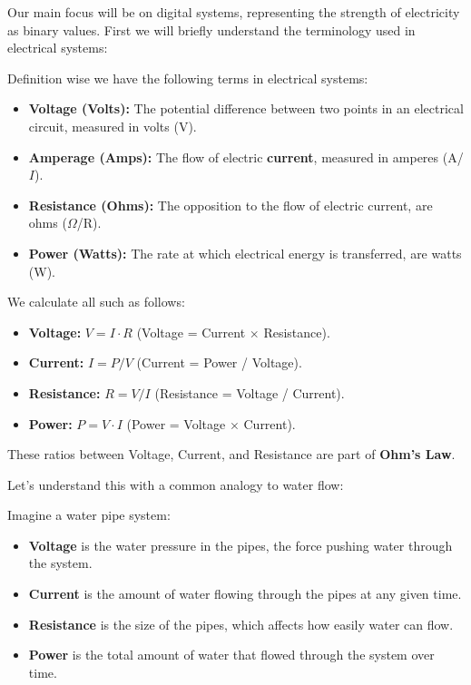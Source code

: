 \noindent
Our main focus will be on digital systems, representing the strength of electricity as binary values.
First we will briefly understand the terminology used in electrical systems:
\begin{Def}

    \label{def:voltage_amps_watts}

    Definition wise we have the following terms in electrical systems:
    \begin{itemize}
        \item \textbf{Voltage (Volts):} The potential difference between two points in an electrical circuit, measured in volts (V).
        \item \textbf{Amperage (Amps):} The flow of electric \textbf{current}, measured in amperes (A/$I$).
        \item \textbf{Resistance (Ohms):} The opposition to the flow of electric current, are ohms ($\Omega$/R).
        \item \textbf{Power (Watts):} The rate at which electrical energy is transferred, are watts (W).
    \end{itemize}

    \noindent
    We calculate all such as follows:
    \begin{itemize}
        \item \textbf{Voltage:} $V = I \cdot R$ (Voltage = Current $\times$ Resistance).
        \item \textbf{Current:} $I = P / V$ (Current = Power / Voltage).
        \item \textbf{Resistance:} $R = V / I$ (Resistance = Voltage / Current).
        \item \textbf{Power:} $P = V \cdot I$ (Power = Voltage $\times$ Current).
    \end{itemize}

    \noindent
    These ratios between Voltage, Current, and Resistance are part of \textbf{Ohm's Law}.
\end{Def}

\newpage 

\noindent
Let's understand this with a common analogy to water flow:

\begin{Example}

    \noindent
    Imagine a water pipe system:
    \begin{itemize}
        \item \textbf{Voltage} is the water pressure in the pipes, the force pushing water through the system.
        \item \textbf{Current} is the amount of water flowing through the pipes at any given time.
        \item \textbf{Resistance} is the size of the pipes, which affects how easily water can flow.
        \item \textbf{Power} is the total amount of water that flowed through the system over time.
    \end{itemize}
\end{Example}


